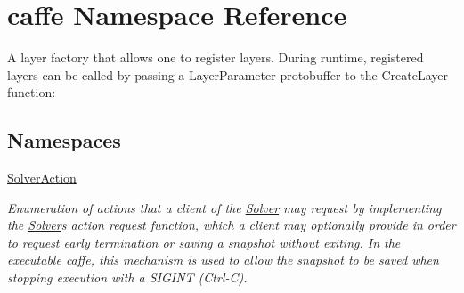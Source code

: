 \hypertarget{namespacecaffe}{}\section{caffe Namespace Reference}
\label{namespacecaffe}


A layer factory that allows one to register layers. During runtime, registered layers can be called by passing a Layer\+Parameter protobuffer to the Create\+Layer function\+:  


\subsection*{Namespaces}
\begin{DoxyCompactItemize}
\item 
 \hyperlink{namespacecaffe_1_1SolverAction}{Solver\+Action}
\begin{DoxyCompactList}\small\item\em Enumeration of actions that a client of the \hyperlink{classcaffe_1_1Solver}{Solver} may request by implementing the \hyperlink{classcaffe_1_1Solver}{Solver}\textquotesingle{}s action request function, which a client may optionally provide in order to request early termination or saving a snapshot without exiting. In the executable caffe, this mechanism is used to allow the snapshot to be saved when stopping execution with a S\+I\+G\+I\+NT (Ctrl-\/C). \end{DoxyCompactList}\end{DoxyCompactItemize}
